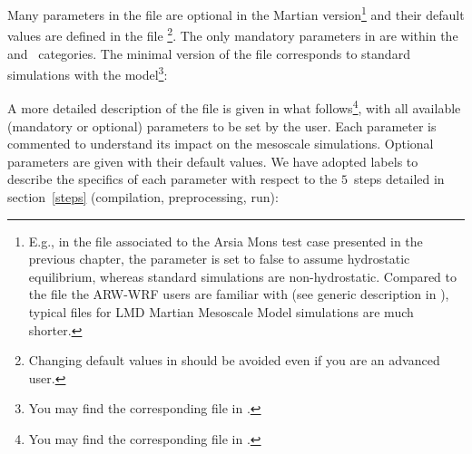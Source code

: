 \sk %
Many parameters in the  file are optional in the Martian version\footnote{E.g., in the  file associated to the Arsia Mons test case presented in the previous chapter, the parameter  is set to false to assume hydrostatic equilibrium, whereas standard simulations are non-hydrostatic. Compared to the file the ARW-WRF users are familiar with (see generic description in ), typical  files for LMD Martian Mesoscale Model simulations are much shorter.} and their default values are defined in the file \footnote{Changing default values in  should be avoided even if you are an advanced user.}. The only mandatory parameters in  are within the~ and~ categories. The minimal version of the  file corresponds to standard simulations with the model\footnote{You may find the corresponding file in .}:
%
\scriptsize
{}
\normalsize

\sk
A more detailed description of the  file is given in what follows\footnote{You may find the corresponding file in .}, with all available (mandatory or optional) parameters to be set by the user. Each parameter is commented to understand its impact on the mesoscale simulations. Optional parameters are given with their default values. We have adopted labels to describe the specifics of each parameter with respect to the $5$~steps detailed in section~\ref{steps} (compilation, preprocessing, run):

